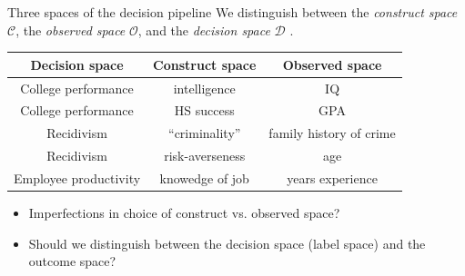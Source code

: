 \documentclass{beamer}
\newcommand{\cO}{\mathcal{O}}
\newcommand{\cC}{\mathcal{C}}
\newcommand{\cD}{\mathcal{D}}
\begin{document}
\begin{frame}{Three spaces of the decision pipeline}
We distinguish between the {\it construct space} $\cC$, the {\it observed space} $\cO$, and the {\it decision space} $\cD$ .

\begin{table}[h!]
  \centering
  \label{tab:table1}
  \begin{tabular}{ccc}
    \toprule
    Decision space & Construct space & Observed space\\
    \midrule
    College performance & intelligence & IQ\\
    College performance & HS success & GPA\\
    Recidivism & ``criminality'' & family history of crime\\
    Recidivism & risk-averseness & age\\
    Employee productivity & knowedge of job & years experience\\
    \bottomrule
  \end{tabular}
\end{table}


\pause
  \begin{itemize}
  \item{
    Imperfections in choice of construct vs. observed space?
  }
  \item<3->{
    Should we distinguish between the decision space (label space) and the outcome space?
  }
  \end{itemize}
\end{frame}
\end{document}
